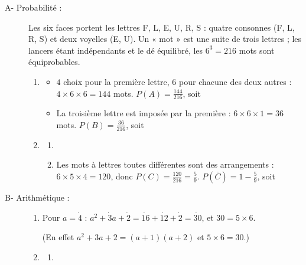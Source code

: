 \begin{description}
	\item[A- Probabilité :]
	Les six faces portent les lettres F, L, E, U, R, S : quatre consonnes (F, L, R, S) et deux voyelles (E, U).
	Un « mot » est une suite de trois lettres ; les lancers étant indépendants et le dé équilibré, les $6^3 = 216$ mots sont équiprobables.
	\begin{enumerate}
		\item
		\begin{itemize}
			\item {}
				$4$ choix pour la première lettre, $6$ pour chacune des deux autres : $4 \times 6 \times 6 = 144$ mots.
				$P(A) = \frac{144}{216}$, soit \par\noindent{}
			\item {}
				La troisième lettre est imposée par la première : $6 \times 6 \times 1 = 36$ mots.
				$P(B) = \frac{36}{216}$, soit \par\noindent{}
		\end{itemize}
		\item
		\begin{enumerate}
			\item {}
			\item {}
				Les mots à lettres toutes différentes sont des arrangements : $6 \times 5 \times 4 = 120$, donc $P(C) = \frac{120}{216} = \frac{5}{9}$.
				$P(\overline{C}) = 1 - \frac{5}{9}$, soit \par\noindent{}
		\end{enumerate}
	\end{enumerate}
	\item[B- Arithmétique :]
	\begin{enumerate}
		\item {}
			Pour $a = \dot{4}$ : $a^2 + \dot{3}a + \dot{2} = \dot{16} + \dot{12} + \dot{2} = \dot{30}$, et $30 = 5 \times 6$.
			\par\noindent{}
			(En effet $a^2 + 3a + 2 = (a+1)(a+2)$ et $5 \times 6 = 30$.)
		\item
		\begin{enumerate}
			\item {}

\end{enumerate}
\end{enumerate}
\end{description}
